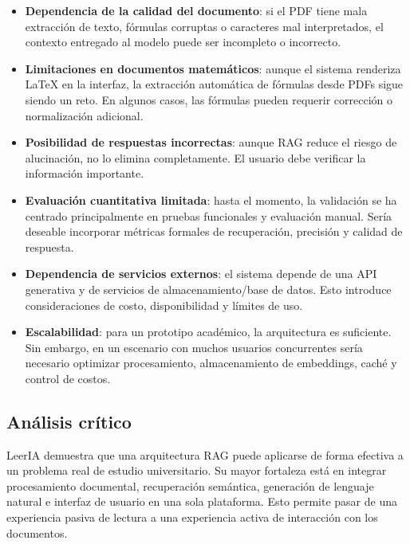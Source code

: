 \documentclass[12pt, letterpaper]{article}
\begin{document}
	\begin{itemize}
		\item \textbf{Dependencia de la calidad del documento}: si el PDF tiene mala extracción de texto, fórmulas corruptas o caracteres mal interpretados, el contexto entregado al modelo puede ser incompleto o incorrecto.
		
		\item \textbf{Limitaciones en documentos matemáticos}: aunque el sistema renderiza LaTeX en la interfaz, la extracción automática de fórmulas desde PDFs sigue siendo un reto. En algunos casos, las fórmulas pueden requerir corrección o normalización adicional.
		
		\item \textbf{Posibilidad de respuestas incorrectas}: aunque RAG reduce el riesgo de alucinación, no lo elimina completamente. El usuario debe verificar la información importante.
		
		\item \textbf{Evaluación cuantitativa limitada}: hasta el momento, la validación se ha centrado principalmente en pruebas funcionales y evaluación manual. Sería deseable incorporar métricas formales de recuperación, precisión y calidad de respuesta.
		
		\item \textbf{Dependencia de servicios externos}: el sistema depende de una API generativa y de servicios de almacenamiento/base de datos. Esto introduce consideraciones de costo, disponibilidad y límites de uso.
		
		\item \textbf{Escalabilidad}: para un prototipo académico, la arquitectura es suficiente. Sin embargo, en un escenario con muchos usuarios concurrentes sería necesario optimizar procesamiento, almacenamiento de embeddings, caché y control de costos.
	\end{itemize}
	
	\subsection{Análisis crítico}
	
	LeerIA demuestra que una arquitectura RAG puede aplicarse de forma efectiva a un problema real de estudio universitario. Su mayor fortaleza está en integrar procesamiento documental, recuperación semántica, generación de lenguaje natural e interfaz de usuario en una sola plataforma. Esto permite pasar de una experiencia pasiva de lectura a una experiencia activa de interacción con los documentos.
	
\end{document}
